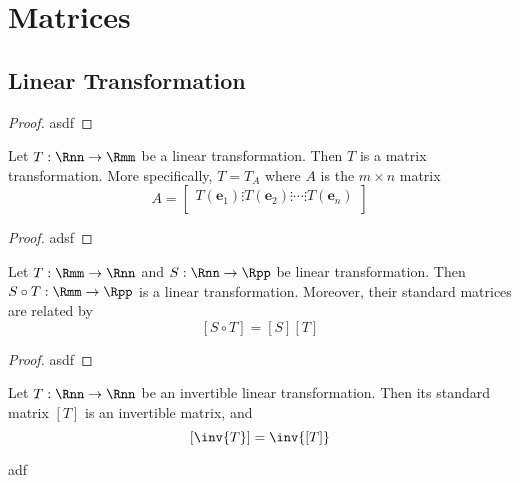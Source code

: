 \setcounter{chapter}{2}
\chapter{Matrices}
\setcounter{section}{5}
\section{Linear Transformation}
\setcounter{theorem}{29}
\begin{proof}
	asdf
\end{proof}
\begin{theorem}
	Let $ T : \Rnn \rightarrow \Rmm $ be a linear transformation. Then $ T $ is a matrix transformation. More specifically, $ T=T_{A} $ where $ A $ is the $ m\times n $ matrix
	$$ A = \begin{bmatrix}
	T(\textbf{e}_1) \vdots T(\textbf{e}_2) \vdots \cdots \vdots T(\textbf{e}_n) \\
	\end{bmatrix} $$
\end{theorem}
\begin{proof}
	adsf
\end{proof}
\begin{theorem}
	Let $ T : \Rmm \rightarrow \Rnn $ and $ S : \Rnn \rightarrow \Rpp $ be linear transformation. Then $ S \circ T : \Rmm \rightarrow \Rpp $ is a linear transformation. Moreover, their standard matrices are related by 
	$$ \left[ S\circ T\right] = \left[S\right]\left[T\right] $$
\end{theorem}
\begin{proof}
	asdf
\end{proof}
\begin{theorem}
	Let $ T : \Rnn \rightarrow \Rnn $ be an invertible linear transformation. Then its standard matrix $ \left[T\right] $ is an invertible matrix, and 
	$$ \left[\inv{T}\right] = \inv{\left[T\right]} $$
\end{theorem}

\begin{corollary}
	adf
\end{corollary}